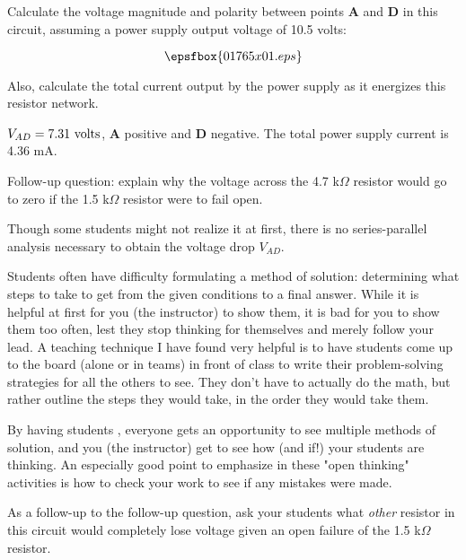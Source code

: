 

Calculate the voltage magnitude and polarity between points {\bf A} and {\bf D} in this circuit, assuming a power supply output voltage of 10.5 volts:

$$\epsfbox{01765x01.eps}$$

Also, calculate the total current output by the power supply as it energizes this resistor network.







$V_{AD} = 7.31 \hbox{ volts}$, {\bf A} positive and {\bf D} negative.  The total power supply current is 4.36 mA.

\vskip 10pt

Follow-up question: explain why the voltage across the 4.7 k$\Omega$ resistor would go to zero if the 1.5 k$\Omega$ resistor were to fail open.







Though some students might not realize it at first, there is no series-parallel analysis necessary to obtain the voltage drop $V_{AD}$.
 
\vskip 10pt

Students often have difficulty formulating a method of solution: determining what steps to take to get from the given conditions to a final answer.  While it is helpful at first for you (the instructor) to show them, it is bad for you to show them too often, lest they stop thinking for themselves and merely follow your lead.  A teaching technique I have found very helpful is to have students come up to the board (alone or in teams) in front of class to write their problem-solving strategies for all the others to see.  They don't have to actually do the math, but rather outline the steps they would take, in the order they would take them.

By having students , everyone gets an opportunity to see multiple methods of solution, and you (the instructor) get to see how (and if!) your students are thinking.  An especially good point to emphasize in these "open thinking" activities is how to check your work to see if any mistakes were made.

\vskip 10pt

As a follow-up to the follow-up question, ask your students what {\it other} resistor in this circuit would completely lose voltage given an open failure of the 1.5 k$\Omega$ resistor.




